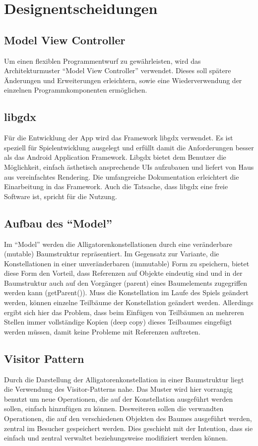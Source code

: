 \chapter{Designentscheidungen}

\section{Model View Controller}
Um einen flexiblen Programmentwurf zu gewährleisten, wird das Architekturmuster "`Model View Controller"' verwendet.
Dieses soll spätere Änderungen und Erweiterungen erleichtern, sowie eine Wiederverwendung der einzelnen Programmkomponenten ermöglichen.

\section{libgdx}
Für die Entwicklung der App wird das Framework libgdx verwendet.
Es ist speziell für Spielentwicklung ausgelegt und erfüllt damit die Anforderungen besser als das Android Application Framework.
 Libgdx bietet dem Benutzer die Möglichkeit, einfach ästhetisch ansprechende UIs aufzubauen und liefert von Haus aus vereinfachtes Rendering.
Die umfangreiche Dokumentation erleichtert die Einarbeitung in das Framework.
Auch die Tatsache, dass libgdx eine freie Software ist, spricht für die Nutzung.

\section{Aufbau des "`Model"'}
Im "`Model"' werden die Alligatorenkonstellationen durch eine veränderbare (mutable) Baumstruktur repräsentiert.
 Im Gegensatz zur Variante, die Konstellationen in einer unveränderbaren (immutable) Form zu speichern, bietet diese Form den Vorteil, dass Referenzen auf Objekte eindeutig sind und in der Baumstruktur auch auf den Vorgänger (parent) eines Baumelements zugegriffen werden kann (getParent()).
Muss die Konstellation im Laufe des Spiels geändert werden, können einzelne Teilbäume der Konstellation geändert werden.
Allerdings ergibt sich hier das Problem, dass beim Einfügen von Teilbäumen an mehreren Stellen immer vollständige Kopien (deep copy) dieses Teilbaumes eingefügt werden müssen, damit keine Probleme mit Referenzen auftreten.

\section{Visitor Pattern}
Durch die Darstellung der Alligatorenkonstellation in einer Baumstruktur liegt die Verwendung des Visitor-Patterns nahe.
Das Muster wird hier vorrangig benutzt um neue Operationen, die auf der Konstellation ausgeführt werden sollen, einfach hinzufügen zu können.
Desweiteren sollen die verwandten Operationen, die auf den verschiedenen Objekten des Baumes ausgeführt werden, zentral im Besucher gespeichert werden.
Dies geschieht mit der Intention, dass sie einfach und zentral verwaltet beziehungsweise modifiziert werden können.
